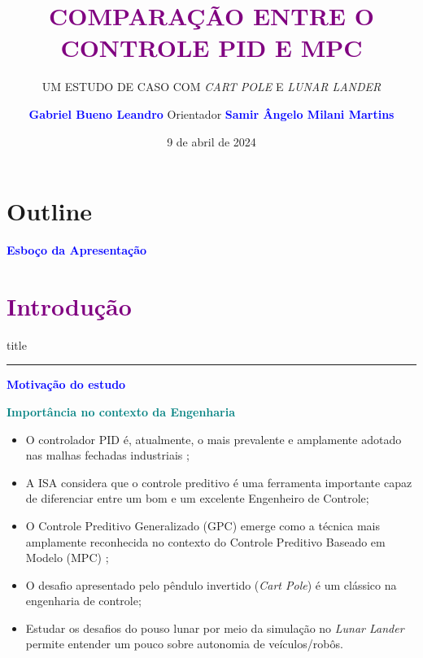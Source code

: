 \documentclass[aspectratio=169]{beamer}
\title{\textbf{\textcolor{purple}{\LARGE COMPARAÇÃO ENTRE O CONTROLE PID E MPC}}}
\subtitle{ UM ESTUDO DE CASO COM \textit{CART POLE} E \textit{LUNAR LANDER}}
\author{\footnotesize \textbf{\textcolor{blue}{Gabriel Bueno Leandro}} \newline Orientador \newline \textbf{\textcolor{blue}{Samir Ângelo Milani Martins \vspace{4mm}}}}
\institute{\footnotesize \textbf{Universidade Federal de São João del-Rei
}\\ \vspace{1mm} Departamento de Engenharia Elétrica}
\date{\tiny 9 de abril de 2024} %
\begin{document}
{ 
\frame{\titlepage}}

\section*{Outline}
\begin{frame}
    {\textcolor{blue}{\textbf{Esboço da Apresentação}}}\tableofcontents
\end{frame}

\section{\textbf{\textcolor{purple}{Introdução}}}
    \begin{frame}[plain]
        \vfill
      \centering
      \begin{beamercolorbox}[sep=8pt,center,shadow=true,rounded=true]{title}
        \insertsectionhead\par%
        \color{oxfordblue}\noindent\rule{10cm}{1pt}
      \end{beamercolorbox}
      \vfill
  \end{frame}

\begin{frame}{\textcolor{blue}{\textbf{Motivação do estudo}}}
    \vspace{-0.75cm}
    \begin{block}{\textbf{\textcolor{teal}{Importância no contexto da Engenharia}}}
    \begin{itemize}[label={}]
        \justifying %
        \item O controlador PID é, atualmente, o mais prevalente e amplamente adotado nas malhas fechadas industriais \cite{deulkar2020analysis};
        \item  A ISA considera que o controle preditivo é uma ferramenta importante capaz de diferenciar entre um bom e um excelente Engenheiro de Controle;
        \item O Controle Preditivo Generalizado (GPC) emerge como a técnica mais amplamente reconhecida no contexto do Controle Preditivo Baseado em Modelo (MPC) \cite{alba2000control};
        \item O desafio apresentado pelo pêndulo invertido (\textit{Cart Pole}) é um clássico na engenharia de controle;
        \item Estudar os desafios do pouso lunar por meio da simulação no \textit{Lunar Lander} permite entender um pouco sobre autonomia de veículos/robôs.
    \end{itemize}
    \end{block}
\end{frame}
 
\end{document}
